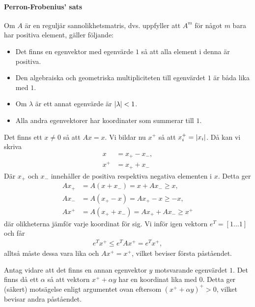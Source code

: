 \paragraph{Perron-Frobenius' sats}
Om $A$ är en reguljär sannolikhetsmatris, dvs. uppfyller att $A^{m}$ för något $m$ bara har positiva element, gäller följande:
\begin{itemize}
	\item Det finns en egenvektor med egenvärde $1$ så att alla element i denna är positiva.
	\item Den algebraiska och geometriska multipliciteten till egenvärdet $1$ är båda lika med $1$.
	\item Om $\lambda$ är ett annat egenvärde är $\abs{\lambda} < 1$.
	\item Alla andra egenvektorer har koordinater som summerar till $1$.
\end{itemize}

\proof
Det finns ett $x\neq 0$ så att $Ax = x$. Vi bildar nu $x^{+}$ så att $x_{i}^{+} = \abs{x_{i}}$. Då kan vi skriva
\begin{align*}
	x     &= x_{+} - x_{-}, \\
	x^{+} &= x_{+} + x_{-}
\end{align*}
Där $x_{+}$ och $x_{-}$ innehåller de positiva respektiva negativa elementen i $x$. Detta ger
\begin{align*}
	Ax_{+} &= A(x + x_{-}) = x + Ax_{-} \geq x, \\
	Ax_{-} &= A(x_{+} - x) = Ax_{+} - x \geq -x, \\
	Ax^{+} &= A(x_{+} + x_{-}) = Ax_{+} + Ax_{-} \geq x^{+}
\end{align*}
där olikheterna jämför varje koordinat för sig. Vi inför igen vektorn $e^{T} = [1 \dots 1]$ och får
\begin{align*}
	e^{T}x^{+} \leq e^{T}Ax^{+} = e^{T}x^{+},
\end{align*}
alltså måste dessa vara lika och $Ax^{+} = x^{+}$, vilket beviser första påståendet.

Antag vidare att det finns en annan egenvektor $y$ motsvarande egenvärdet $1$. Det finns då ett $\alpha$ så att vektorn $x^{+} + \alpha y$ har en koordinat lika med $0$. Detta ger (säkert) motsägelse enligt argumentet ovan eftersom $(x^{+} + \alpha y)^{+} > 0$, vilket bevisar andra påståendet.

